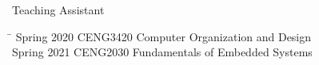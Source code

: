
\begin{rSection}{Teaching Assistant}
\begin{tabbing}
\hspace{1.0in}\= \kill
Spring 2020    \>  CENG3420 Computer Organization and Design \\
Spring 2021    \>  CENG2030  Fundamentals of Embedded Systems
\end{tabbing}
\end{rSection}

